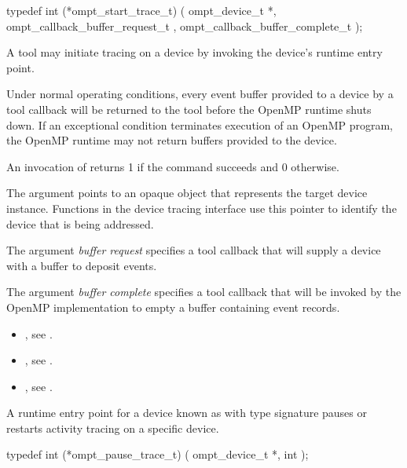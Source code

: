 \format
\begin{ccppspecific}
\begin{omptInquiry}
typedef int (*ompt_start_trace_t) (
  ompt_device_t *,
  ompt_callback_buffer_request_t ,
  ompt_callback_buffer_complete_t 
);
\end{omptInquiry}
\end{ccppspecific}

\descr
A tool may initiate tracing on a device by invoking the device's 
runtime entry point.

Under normal operating conditions, every event buffer provided to
a device by a tool callback will be returned to the tool
before the OpenMP runtime shuts down.
If an exceptional condition terminates  execution of an OpenMP
program, the OpenMP runtime may not return buffers provided to the
device.

An invocation of  returns 1 if the command
succeeds and 0 otherwise.

\argdesc
The  argument points to an opaque object that represents
the target device instance. Functions in the device tracing interface
use this pointer to identify the device that is being addressed.

The argument \emph{buffer request} specifies a tool callback
that will supply a device with a buffer to deposit events.

The argument \emph{buffer complete} specifies a tool callback
that will be invoked by the OpenMP implementation to empty a buffer
containing event records.

\crossreferences
\begin{itemize}
\item {},
see .
\item {},
see .
\item {},
see .
\end{itemize}

\label{sec:ompt_pause_trace_t}

\summary
A runtime entry point for a device known as 
with type signature 
pauses or restarts activity tracing on a specific device.

\begin{ccppspecific}
\begin{omptInquiry}
typedef int (*ompt_pause_trace_t) (
  ompt_device_t *,
  int 
);
\end{omptInquiry}
\end{ccppspecific}

